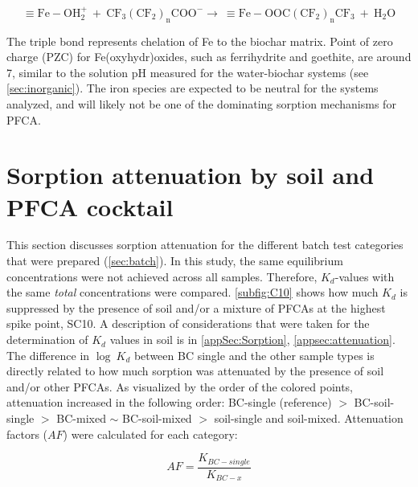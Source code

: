 \begin{equation}
    \mathrm{\equiv Fe-OH_2^+ ~ + ~ CF_3(CF_2)_nCOO^- \rightarrow ~ \equiv Fe-OOC(CF_2)_nCF_3 ~+~ H_2O}
\end{equation}

The triple bond represents chelation of Fe to the biochar matrix. Point of zero charge (PZC) for Fe(oxyhydr)oxides, such as ferrihydrite and goethite, are around 7, similar to the solution pH measured for the water-biochar systems (see \cref{sec:inorganic}). The iron species are expected to be neutral for the systems analyzed, and will likely not be one of the dominating sorption mechanisms for PFCA. 


\section{Sorption attenuation by soil and PFCA cocktail}
This section discusses sorption attenuation for the different batch test categories that were prepared (\cref{sec:batch}). In this study, the same equilibrium concentrations were not achieved across all samples. Therefore, $K_d$-values with the same \textit{total} concentrations were compared. \cref{subfig:C10} shows how much $K_d$ is suppressed by the presence of soil and/or a mixture of PFCAs at the highest spike point, SC10. A description of considerations that were taken for the determination of $K_d$ values in soil is in \cref{appSec:Sorption}, \cref{appsec:attenuation}. The difference in $\log~K_d$ between BC single and the other sample types is directly related to how much sorption was attenuated by the presence of soil and/or other PFCAs. As visualized by the order of the colored points, attenuation increased in the following order: BC-single (reference) $>$ BC-soil-single $>$ BC-mixed $\sim$ BC-soil-mixed $>$ soil-single and soil-mixed. Attenuation factors ($AF$) were calculated for each category:

\begin{equation} \label{eq:$AF$}
    AF = \frac{K_{BC-single}}{K_{BC-x}}
\end{equation}

